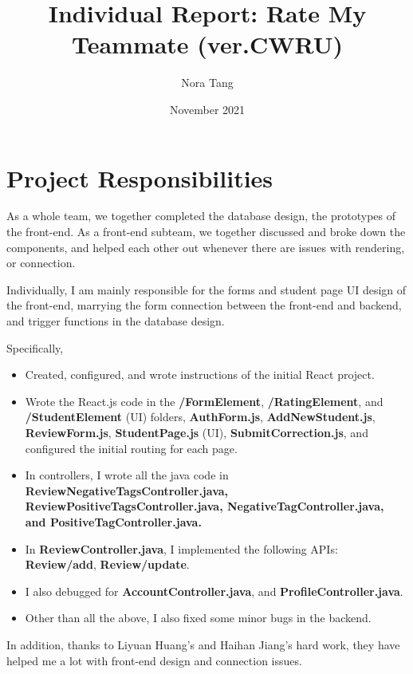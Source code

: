 \documentclass[12pt]{article}
\title{Individual Report: Rate My Teammate (ver.CWRU)}
\author{Nora Tang}
\date{November 2021}
\begin{document}
\maketitle
\section{Project Responsibilities}
As a whole team, we together completed the database design, the prototypes of the front-end.  As a front-end subteam, we together discussed and broke down the components, and helped each other out whenever there are issues with rendering, or connection.

Individually, I am mainly responsible for the forms and student page UI design of the front-end, marrying the form connection between the front-end and backend, and trigger functions in the database design.

Specifically, 
\begin{itemize}
    \item Created, configured, and wrote instructions of the initial React project. 
    \item Wrote the React.js code in the \textbf{/FormElement}, \textbf{/RatingElement}, and \textbf{/StudentElement} (UI)
    folders, \textbf{AuthForm.js}, \textbf{AddNewStudent.js}, \textbf{ReviewForm.js}, \textbf{StudentPage.js} (UI), 
    \textbf{SubmitCorrection.js}, and configured the initial routing for each page. 
    \item In controllers, I wrote all the java code in \textbf{ReviewNegativeTagsController.java, ReviewPositiveTagsController.java, NegativeTagController.java, and PositiveTagController.java.}
    \item In \textbf{ReviewController.java}, I implemented the following APIs: \textbf{Review/add}, \textbf{Review/update}.
    \item I also debugged for \textbf{AccountController.java}, and \textbf{ProfileController.java}.
    \item Other than all the above, I also fixed some minor bugs in the backend.
\end{itemize}
In addition, thanks to Liyuan Huang's and Haihan Jiang's hard work, they have helped me a lot with front-end design and connection issues. 
\end{document}
